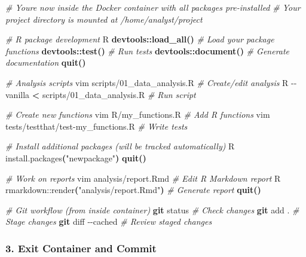 \documentclass[
]{article}
\newenvironment{Shaded}{\begin{snugshade}}{\end{snugshade}}
\newcommand{\AttributeTok}[1]{\textcolor[rgb]{0.13,0.29,0.53}{#1}}
\newcommand{\CommentTok}[1]{\textcolor[rgb]{0.56,0.35,0.01}{\textit{#1}}}
\newcommand{\ErrorTok}[1]{\textcolor[rgb]{0.64,0.00,0.00}{\textbf{#1}}}
\newcommand{\ExtensionTok}[1]{#1}
\newcommand{\FunctionTok}[1]{\textcolor[rgb]{0.13,0.29,0.53}{\textbf{#1}}}
\newcommand{\KeywordTok}[1]{\textcolor[rgb]{0.13,0.29,0.53}{\textbf{#1}}}
\newcommand{\NormalTok}[1]{#1}
\newcommand{\OperatorTok}[1]{\textcolor[rgb]{0.81,0.36,0.00}{\textbf{#1}}}
\newcommand{\StringTok}[1]{\textcolor[rgb]{0.31,0.60,0.02}{#1}}
\begin{document}
\begin{Shaded}
\begin{Highlighting}[]
\CommentTok{\# You\textquotesingle{}re now inside the Docker container with all packages pre{-}installed}
\CommentTok{\# Your project directory is mounted at /home/analyst/project}

\CommentTok{\# R package development}
\ExtensionTok{R}
\FunctionTok{devtools::load\_all()}           \CommentTok{\# Load your package functions}
\FunctionTok{devtools::test()}              \CommentTok{\# Run tests}
\FunctionTok{devtools::document()}          \CommentTok{\# Generate documentation}
\FunctionTok{quit()}

\CommentTok{\# Analysis scripts}
\ExtensionTok{vim}\NormalTok{ scripts/01\_data\_analysis.R    }\CommentTok{\# Create/edit analysis}
\ExtensionTok{R} \AttributeTok{{-}{-}vanilla} \OperatorTok{\textless{}}\NormalTok{ scripts/01\_data\_analysis.R  }\CommentTok{\# Run script}

\CommentTok{\# Create new functions}
\ExtensionTok{vim}\NormalTok{ R/my\_functions.R          }\CommentTok{\# Add R functions}
\ExtensionTok{vim}\NormalTok{ tests/testthat/test{-}my\_functions.R  }\CommentTok{\# Write tests}

\CommentTok{\# Install additional packages (will be tracked automatically)}
\ExtensionTok{R}
\ExtensionTok{install.packages}\ErrorTok{(}\StringTok{"newpackage"}\KeywordTok{)}
\FunctionTok{quit()}

\CommentTok{\# Work on reports}
\ExtensionTok{vim}\NormalTok{ analysis/report.Rmd       }\CommentTok{\# Edit R Markdown report}
\ExtensionTok{R}
\ExtensionTok{rmarkdown::render}\ErrorTok{(}\StringTok{"analysis/report.Rmd"}\KeywordTok{)}  \CommentTok{\# Generate report}
\FunctionTok{quit()}

\CommentTok{\# Git workflow (from inside container)}
\FunctionTok{git}\NormalTok{ status                    }\CommentTok{\# Check changes}
\FunctionTok{git}\NormalTok{ add .                    }\CommentTok{\# Stage changes}
\FunctionTok{git}\NormalTok{ diff }\AttributeTok{{-}{-}cached}            \CommentTok{\# Review staged changes}
\end{Highlighting}
\end{Shaded}

\subsubsection{3. Exit Container and
Commit}\label{exit-container-and-commit}
\end{document}
